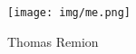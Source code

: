 
\begin{minipage}[c]{5cm}
  \texttt{[image: img/me.png]}
\end{minipage}
\begin{minipage}[c]{10cm}
Thomas Remion
\end{minipage}
